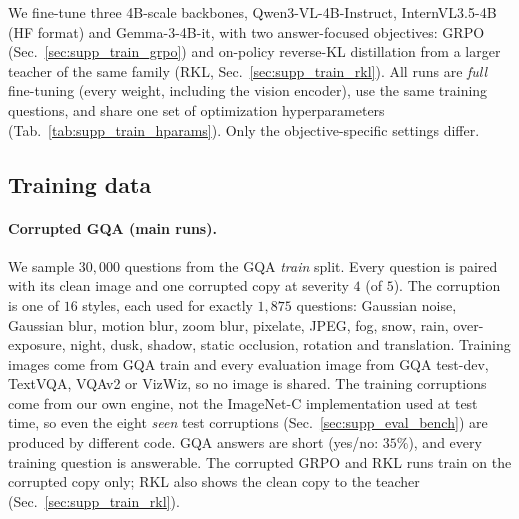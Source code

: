 We fine-tune three 4B-scale backbones, Qwen3-VL-4B-Instruct, InternVL3.5-4B (HF format)
and Gemma-3-4B-it, with two answer-focused objectives: GRPO
(Sec.~\ref{sec:supp_train_grpo}) and on-policy reverse-KL distillation from a larger
teacher of the same family (RKL, Sec.~\ref{sec:supp_train_rkl}). All runs are
\emph{full} fine-tuning (every weight, including the vision encoder), use the same
training questions, and share one set of optimization hyperparameters
(Tab.~\ref{tab:supp_train_hparams}). Only the objective-specific settings differ.

\subsection{Training data}
\label{sec:supp_train_data}

\paragraph{Corrupted GQA (main runs).}
We sample $30{,}000$ questions from the GQA \emph{train} split. Every question is paired
with its clean image and one corrupted copy at severity $4$ (of $5$). The corruption is
one of $16$ styles, each used for exactly $1{,}875$ questions: Gaussian noise, Gaussian
blur, motion blur, zoom blur, pixelate, JPEG, fog, snow, rain, over-exposure, night,
dusk, shadow, static occlusion, rotation and translation. Training images come from GQA
train and every evaluation image from GQA test-dev, TextVQA, VQAv2 or VizWiz, so no
image is shared. The training corruptions come from our own engine, not the ImageNet-C
implementation used at test time, so even the eight \emph{seen} test corruptions
(Sec.~\ref{sec:supp_eval_bench}) are produced by different code. GQA answers are short
(yes/no: $35\%$), and every training question is answerable. The corrupted GRPO and RKL
runs train on the corrupted copy only; RKL also shows the clean copy to the teacher
(Sec.~\ref{sec:supp_train_rkl}).

